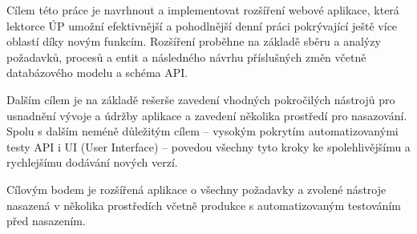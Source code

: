 Cílem této práce je navrhnout a implementovat rozšíření webové aplikace, která lektorce ÚP umožní efektivnější a pohodlnější denní práci pokrývající ještě více oblastí díky novým funkcím. Rozšíření proběhne na základě sběru a analýzy požadavků, procesů a entit a následného návrhu příslušných změn včetně databázového modelu a schéma API.

Dalším cílem je na základě rešerše zavedení vhodných pokročilých nástrojů pro usnadnění vývoje a údržby aplikace a zavedení několika prostředí pro nasazování. Spolu s dalším neméně důležitým cílem -- vysokým pokrytím automatizovanými testy API i UI (User Interface) -- povedou všechny tyto kroky ke spolehlivějšímu a rychlejšímu dodávání nových verzí.

Cílovým bodem je rozšířená aplikace o všechny požadavky a zvolené nástroje nasazená v několika prostředích včetně produkce s automatizovaným testováním před nasazením.

